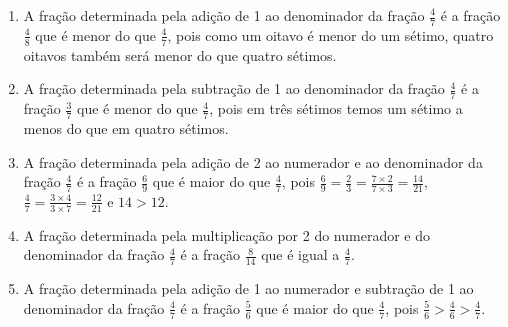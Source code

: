 \begin{atividade}
\begin{enumerate}
    \item       A fração determinada pela adição de 1 ao denominador da fração
    $\frac{4}{7}$       é a fração       $\frac{4}{8}$       que é menor do que
     $\frac{4}{7}$, pois como um oitavo é menor do um sétimo, quatro oitavos
também será menor do que quatro sétimos.
    \item       A fração determinada pela subtração de 1 ao denominador da
fração       $\frac{4}{7}$       é a fração       $\frac{3}{7}$       que é
menor do que       $\frac{4}{7}$, pois em três sétimos temos um sétimo a menos
do que em quatro sétimos.
    \item       A fração determinada pela adição de 2 ao numerador e ao
denominador da fração       $\frac{4}{7}$       é a fração       $\frac{6}{9}$
    que é maior do que       $\frac{4}{7}$, pois       $\frac{6}{9} =
\frac{2}{3} = \frac{7 \times 2}{7 \times 3} = \frac{14}{21}$,       $\frac{4}{7}
= \frac{3 \times 4}{3 \times 7} = \frac{12}{21}$       e       $14 > 12$.
    \item       A fração determinada pela multiplicação por 2 do numerador e do
denominador da fração       $\frac{4}{7}$       é a fração       $\frac{8}{14}$
     que é igual a       $\frac{4}{7}$.
    \item       A fração determinada pela adição de 1 ao numerador e subtração
de 1 ao denominador da fração       $\frac{4}{7}$       é a fração
$\frac{5}{6}$       que é maior do que       $\frac{4}{7}$, pois
$\frac{5}{6} > \frac{4}{6} > \frac{4}{7}$.
\end{enumerate} %
\end{atividade}

\clearpage

